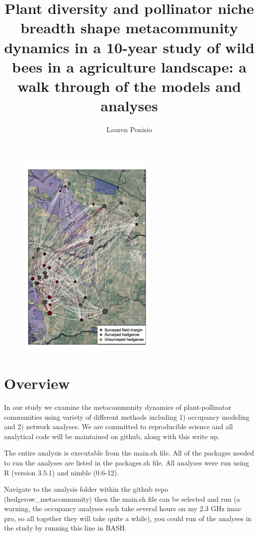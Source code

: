 \documentclass{article}\usepackage[]{graphicx}\usepackage[]{color}
\begin{document}
\title{Plant diversity and pollinator niche breadth shape
metacommunity dynamics in a 10-year study of wild bees in a
agriculture landscape: a walk through of the models and analyses}
\author{Lauren Ponisio}


\maketitle

\begin{figure}[h!]
\centering
\includegraphics[width=0.6\textwidth]{figure/degree_spatial.pdf}
\label{fig:network}
\end{figure}
\clearpage

\section{Overview}
In our study we examine the metacommunity dynamics of plant-pollinator
communities using variety of different methods including 1) occupancy
modeling and 2) network analyses.  We are committed to reproducible
science and all analytical code will be maintained on github, along
with this write up.

The entire analysis is executable from the main.sh file. All of the
packages needed to run the analyses are listed in the packages.sh
file. All analyses were run using R (version $3.5.1$)
and nimble (0.6-12). 

Navigate to the analysis folder within the github repo
(hedgerow\_metacommunity) then the main.sh file can be selected and
run (a warning, the occupancy analyses each take several hours on my
2.3 GHz imac pro, so all together they will take quite a while), you
could run of the analyses in the study by running this line in BASH.
\end{document}
